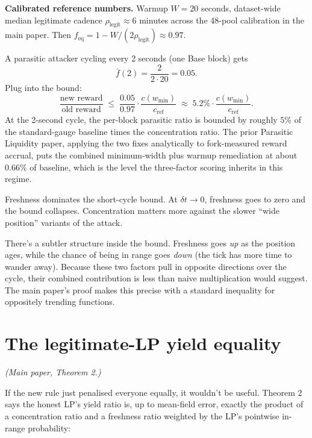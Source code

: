 \documentclass[11pt,a4paper]{article}
\begin{document}
\begin{example}
\textbf{Calibrated reference numbers.} Warmup $W = 20$ seconds, dataset-wide median legitimate cadence $\rho_{\text{legit}} \approx 6$ minutes across the 48-pool calibration in the main paper. Then $f_{\text{eq}} = 1 - W/(2\rho_{\text{legit}}) \approx 0.97$.

A parasitic attacker cycling every 2 seconds (one Base block) gets
\[
\bar f(2) = \frac{2}{2 \cdot 20} = 0.05.
\]
Plug into the bound:
\[
\frac{\text{new reward}}{\text{old reward}} \;\leq\; \frac{0.05}{0.97} \cdot \frac{c(w_{\min})}{c_{\text{ref}}} \;\approx\; 5.2\% \cdot \frac{c(w_{\min})}{c_{\text{ref}}}.
\]
At the 2-second cycle, the per-block parasitic ratio is bounded by roughly $5\%$ of the standard-gauge baseline times the concentration ratio. The prior Parasitic Liquidity paper, applying the two fixes analytically to fork-measured reward accrual, puts the combined minimum-width plus warmup remediation at about $0.66\%$ of baseline, which is the level the three-factor scoring inherits in this regime.
\end{example}

\begin{intuition}
Freshness dominates the short-cycle bound. At $\delta t \to 0$, freshness goes to zero and the bound collapses. Concentration matters more against the slower ``wide position'' variants of the attack.

There's a subtler structure inside the bound. Freshness goes \emph{up} as the position ages, while the chance of being in range goes \emph{down} (the tick has more time to wander away). Because these two factors pull in opposite directions over the cycle, their combined contribution is less than naive multiplication would suggest. The main paper's proof makes this precise with a standard inequality for oppositely trending functions.
\end{intuition}

\section{The legitimate-LP yield equality}

\emph{(Main paper, Theorem 2.)}

If the new rule just penalised everyone equally, it wouldn't be useful. Theorem 2 says the honest LP's yield ratio is, up to mean-field error, exactly the product of a concentration ratio and a freshness ratio weighted by the LP's pointwise in-range probability:
\end{document}
